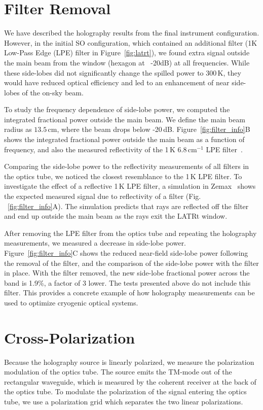 \section{Filter Removal}
\label{sec:filter}
We have described the holography results from the final instrument configuration.  However, in the initial SO configuration, which contained an additional filter (1K Low-Pass Edge (LPE) filter in Figure~\ref{fig:latrt}), we found extra signal outside the main beam from the window (hexagon at ~-20dB) at all frequencies.  While these side-lobes did not significantly change the spilled power to 300\,K, they would have reduced optical efficiency and led to an enhancement of near side-lobes of the on-sky beam.

To study the frequency dependence of side-lobe power, we computed the integrated fractional power outside the main beam.  We define the main beam radius as $13.5$\,cm, where the beam drops below -20\,dB.   Figure~\ref{fig:filter_info}B shows the integrated fractional power outside the main beam as a function of frequency, and also the measured reflectivity of the 1\,K 6.8\,cm$^{-1}$ LPE filter~\cite{10.1117/12.673162}.

Comparing the side-lobe power to the reflectivity measurements of all filters in the optics tube, we noticed the closest resemblance to the 1\,K LPE filter.  To investigate the effect of a reflective 1\,K LPE filter, a simulation in Zemax~\cite{zeemax} shows the expected measured signal due to reflectivity of a filter (Fig. ~\ref{fig:filter_info}A).  The simulation predicts that rays are reflected off the filter and end up outside the main beam as the rays exit the LATRt window.

After removing the LPE filter from the optics tube and repeating the holography measurements, we measured a decrease in side-lobe power.  Figure~\ref{fig:filter_info}C shows the reduced near-field side-lobe power following the removal of the filter, and the comparison of the side-lobe power with the filter in place.  With the filter removed, the new side-lobe fractional power across the band is 1.9\%, a factor of 3 lower.   The tests presented above do not include this filter.  This provides a concrete example of how holography measurements can be used to optimize cryogenic optical systems.
  
\section{Cross-Polarization}
\label{sec:crosspol}
Because the holography source is linearly polarized, we measure the polarization modulation of the optics tube.  The source emits the TM-mode out of the rectangular waveguide, which is measured by the coherent receiver at the back of the optics tube.  To modulate the polarization of the signal entering the optics tube, we use a polarization grid which separates the two linear polarizations.

